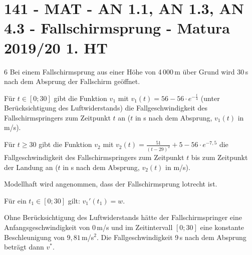 \section{141 - MAT - AN 1.1, AN 1.3, AN 4.3 - Fallschirmsprung - Matura 2019/20 1. HT}

\begin{langesbeispiel}\item[6] %
Bei einem Fallschirmsprung aus einer Höhe von 4\,000\,m über Grund wird 30\,s nach dem Absprung der Fallschirm geöffnet.

Für $t\in[0;30]$ gibt die Funktion $v_1$ mit $v_1(t)=56-56\cdot e^{-\frac{t}{4}}$ (unter Berücksichtigung des Luftwiderstands) die Fallgeschwindigkeit des Fallschirmspringers zum Zeitpunkt $t$ an ($t$ in s nach dem Absprung, $v_1(t)$ in m/s).

Für $t\geq 30$ gibt die Funktion $v_2$ mit $v_2(t)=\frac{51}{(t-29)^2}+5-56\cdot e^{-7,5}$ die Fallgeschwindigkeit des Fallschirmspringers zum Zeitpunkt $t$ bis zum Zeitpunkt der Landung an ($t$ in s nach dem Absprung, $v_2(t)$ in m/s).

Modellhaft wird angenommen, dass der Fallschirmsprung lotrecht ist.%

\begin{aufgabenstellung}
\item %


Für ein $t_1\in[0;30]$ gilt: $v_1'(t_1)=w$.


\item %


\item Ohne Berücksichtigung des Luftwiderstands hätte der Fallschirmspringer eine Anfangsgeschwindigkeit von 0\,m/s und im Zeitintervall $[0;30]$ eine konstante Beschleunigung von $9,81$\,m/s$^2$. Die Fallgeschwindigkeit 9\,s nach dem Absprung beträgt dann $v^*$.%



\end{aufgabenstellung}
\end{langesbeispiel}
